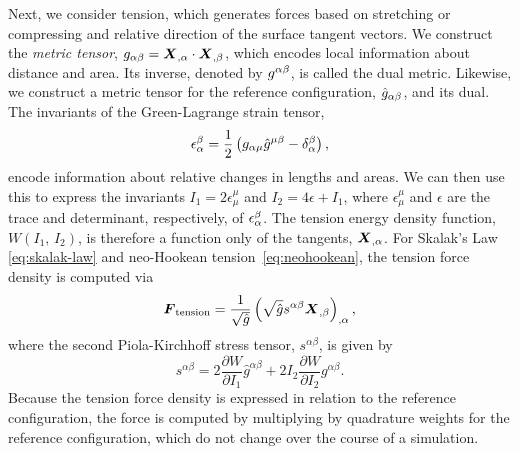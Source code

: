 Next, we consider tension, which generates forces based on stretching or compressing
and relative direction of the surface tangent vectors. We construct the \emph{metric
tensor}, $g_{\alpha\beta} = \boldsymbol{X}_{,\alpha}\cdot\boldsymbol{X}_{,\beta}$, which encodes local
information about distance and area. Its inverse, denoted by $g^{\alpha\beta}$, is
called the dual metric. Likewise, we construct a metric tensor for the reference
configuration, $\hat{g}_{\alpha\beta}$, and its dual. The invariants of the
Green-Lagrange strain tensor,
\begin{equation}
    \epsilon_\alpha^\beta = \frac12\left(g_{\alpha\mu}\hat{g}^{\mu\beta}-\delta_\alpha^\beta\right),
\end{equation}
encode information about relative changes in lengths and areas. We can then use this to
express the invariants $I_1 = 2\epsilon_\mu^\mu$ and $I_2 = 4\epsilon + I_1$, where
$\epsilon_\mu^\mu$ and $\epsilon$ are the trace and determinant, respectively, of
$\epsilon_\alpha^{\smash\beta}$. The tension energy density function, $W(I_1,\,I_2)$, is
therefore a function only of the tangents, $\boldsymbol{X}_{,\alpha}$. For Skalak's Law~%
\eqref{eq:skalak-law} and neo-Hookean tension~\eqref{eq:neohookean}, the tension force
density is computed via~\cite{Maxian:2018ek}
\begin{equation}\label{eq:tension-force}
    \boldsymbol{F}_\text{tension} = \frac{1}{\sqrt{\hat{g}}}\left(\sqrt{\hat{g}}s^{\alpha\beta}\boldsymbol{X}_{,\beta}\right)_{,\alpha},
\end{equation}
where the second Piola-Kirchhoff stress tensor, $s^{\alpha\beta}$, is given by
\begin{equation}
    s^{\alpha\beta} = 2\frac{\partial W}{\partial I_1} \hat{g}^{\alpha\beta} + 2I_2\frac{\partial W}{\partial I_2} g^{\alpha\beta}.
\end{equation}
Because the tension force density is expressed in relation to the reference
configuration, the force is computed by multiplying by quadrature weights for the
reference configuration, which do not change over the course of a simulation.

